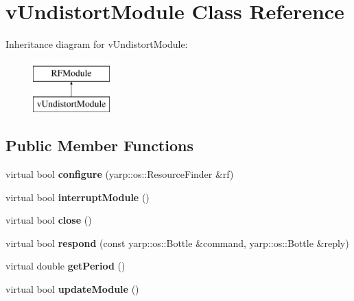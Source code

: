 \hypertarget{classvUndistortModule}{\section{v\-Undistort\-Module Class Reference}
\label{classvUndistortModule}
}
Inheritance diagram for v\-Undistort\-Module\-:\begin{figure}[H]
\begin{center}
\leavevmode
\includegraphics[height=2.000000cm]{classvUndistortModule}
\end{center}
\end{figure}
\subsection*{Public Member Functions}
\begin{DoxyCompactItemize}
\item 
\hypertarget{classvUndistortModule_a9f4fce79ccdc9e9b3b2269c4d94beb22}{virtual bool {\bfseries configure} (yarp\-::os\-::\-Resource\-Finder \&rf)}\label{classvUndistortModule_a9f4fce79ccdc9e9b3b2269c4d94beb22}

\item 
\hypertarget{classvUndistortModule_ab552bfdeddb57cb1cb332169761571d8}{virtual bool {\bfseries interrupt\-Module} ()}\label{classvUndistortModule_ab552bfdeddb57cb1cb332169761571d8}

\item 
\hypertarget{classvUndistortModule_a03d2de14720d332b0bbafe5b200f3ce0}{virtual bool {\bfseries close} ()}\label{classvUndistortModule_a03d2de14720d332b0bbafe5b200f3ce0}

\item 
\hypertarget{classvUndistortModule_a11c58860f7bcd6783d8265b55b8a4fe9}{virtual bool {\bfseries respond} (const yarp\-::os\-::\-Bottle \&command, yarp\-::os\-::\-Bottle \&reply)}\label{classvUndistortModule_a11c58860f7bcd6783d8265b55b8a4fe9}

\item 
\hypertarget{classvUndistortModule_a8ec64be6e169a66a5c68aedb3f8618f0}{virtual double {\bfseries get\-Period} ()}\label{classvUndistortModule_a8ec64be6e169a66a5c68aedb3f8618f0}

\item 
\hypertarget{classvUndistortModule_a68a6946ee4bb8197ec555cf3d2f3b657}{virtual bool {\bfseries update\-Module} ()}\label{classvUndistortModule_a68a6946ee4bb8197ec555cf3d2f3b657}

\end{DoxyCompactItemize}


